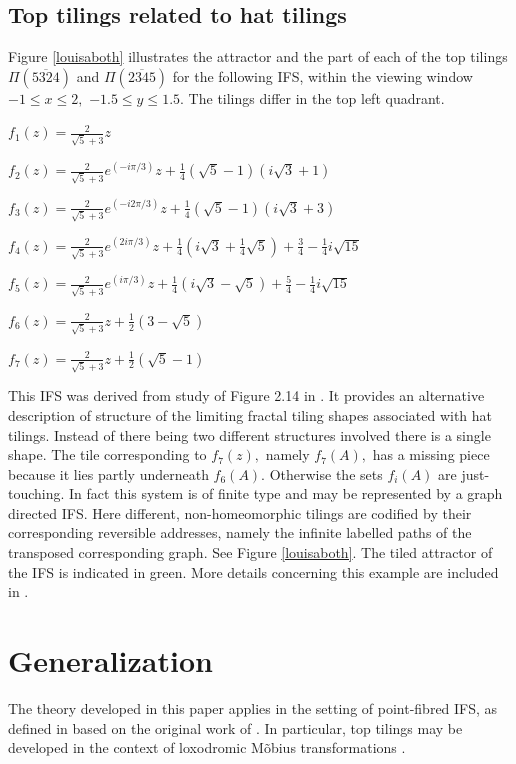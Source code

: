 \documentclass{amsproc}%
\theoremstyle{plain}
\theoremstyle{definition}
\numberwithin{equation}{section}
\begin{document}
\subsection{Top tilings related to hat tilings}

Figure \ref{louisaboth} illustrates the attractor and the part of each of the
top tilings $\Pi(\overline{5324})$ and $\Pi(\overline{2345})$ for the
following IFS, within the viewing window $-1\leq x\leq2,$ $-1.5\leq y\leq1.5.$
The tilings differ in the top left quadrant.

$f_{1}(z)=\frac{2}{\sqrt{5}+3}z$

$f_{2}(z)=\frac{2}{\sqrt{5}+3}e^{(-i\pi/3)}z+\frac{1}{4}\left(  \sqrt
{5}-1\right)  \left(  i\sqrt{3}+1\right)  $

$f_{3}(z)=\frac{2}{\sqrt{5}+3}e^{(-i2\pi/3)}z+\frac{1}{4}\left(  \sqrt
{5}-1\right)  \left(  i\sqrt{3}+3\right)  $

$f_{4}(z)=\frac{2}{\sqrt{5}+3}e^{(2i\pi/3)}z+\frac{1}{4}\left(  i\sqrt
{3}+\frac{1}{4}\sqrt{5}\right)  +\frac{3}{4}-\frac{1}{4}i\sqrt{15}$

$f_{5}(z)=\frac{2}{\sqrt{5}+3}e^{(i\pi/3)}z+\frac{1}{4}(i\sqrt{3}-\sqrt
{5})+\frac{5}{4}-\frac{1}{4}i\sqrt{15}$

$f_{6}(z)=\frac{2}{\sqrt{5}+3}z+\frac{1}{2}(3-\sqrt{5})$

$f_{7}(z)=\frac{2}{\sqrt{5}+3}z+\frac{1}{2}(\sqrt{5}-1)$

This IFS was derived from study of Figure 2.14 in \cite{smith}. It provides an
alternative description of structure of the limiting fractal tiling shapes
associated with hat tilings. Instead of there being two different structures
involved there is a single shape. The tile corresponding to $f_{7}(z),$ namely
$f_{7}(A),$ has a missing piece because it lies partly underneath $f_{6}(A).$
Otherwise the sets $f_{i}(A)$ are just-touching. In fact this system is of
finite type and may be represented by a graph directed IFS. Here different,
non-homeomorphic tilings are codified by their corresponding reversible
addresses, namely the infinite labelled paths of the transposed corresponding
graph. See Figure \ref{louisaboth}. The tiled attractor of the IFS is
indicated in green. More details concerning this example are included in
\cite{corey}.

\section{Generalization}

The theory developed in this paper applies in the setting of point-fibred IFS,
as defined in \cite{tilings} based on the original work of \cite{kieninger}.
In particular, top tilings may be developed in the context of loxodromic
M\~{o}bius transformations \cite{vince}.
\end{document}
